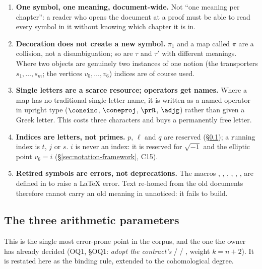 \begin{enumerate}[label=(N\arabic*)]
\item\label{N1} \textbf{One symbol, one meaning, document-wide.} Not
  ``one meaning per chapter'': a reader who opens the document at a proof must be
  able to read every symbol in it without knowing which chapter it is in.
\item\label{N2} \textbf{Decoration does not create a new symbol.} $\pi_1$ and a map
  called $\pi$ are a collision, not a disambiguation; so are $\tau$ and $\tau'$ with
  different meanings. Where two objects are genuinely two instances of one notion
  (the transporters $s_1,\dots,s_m$; the vertices $v_0,\dots,v_6$) indices are of
  course used.
\item\label{N3} \textbf{Single letters are a scarce resource; operators get names.}
  Where a map has no traditional single-letter name, it is written as a named
  operator in upright type ($\coneinc$, $\coneproj$, $\prR$, $\adjg$) rather than
  given a Greek letter. This costs three characters and buys a permanently free letter.
\item\label{N4} \textbf{Indices are letters, not primes.} $p$, $\ell$ and $q$ are
  reserved (\S\ref{sec:notation-primes}); a running index is $t$, $j$ or $s$. $i$ is
  never an index: it is reserved for $\sqrt{-1}$ and the elliptic point $v_6=i$
  (\S\ref{sec:notation-framework}, C15).
\item\label{N5} \textbf{Retired symbols are errors, not deprecations.} The macros
  , , ,
  , , ,
   are defined in  to raise a
  \LaTeX{} error. Text re-homed from the old documents therefore cannot carry an old
  meaning in unnoticed: it fails to build.
\end{enumerate}

\subsection{The three arithmetic parameters}\label{sec:notation-primes}

This is the single most error-prone point in the corpus, and the one the owner has
already decided (OQ1,  \S OQ1:
\emph{adopt the contract's}  /  / , weight
$k=n+2$). It is restated here as the binding rule, extended to the cohomological degree.


